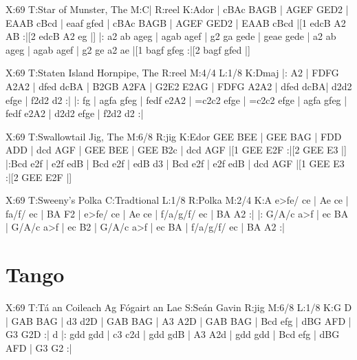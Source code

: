 \documentclass{article}
\begin{document}
\begin{abc}[name]
X:69
T:Star of Munster, The
M:C|
R:reel
K:Ador
| cBAc BAGB | AGEF GED2 | EAAB cBcd | eaaf gfed |
cBAc BAGB | AGEF GED2 | EAAB cBcd |[1 edcB A2 AB :|[2 edcB A2 eg |]
|: a2 ab ageg | agab agef | g2 ga gede | geae gede |
a2 ab ageg | agab agef | g2 ge a2 ae |[1 bagf gfeg :|[2 bagf gfed |]
\end{abc}

\begin{abc}[name]
X:69
T:Staten Island Hornpipe, The
R:reel
M:4/4
L:1/8
K:Dmaj
|: A2 | FDFG A2A2 | dfed dcBA | B2GB A2FA | G2E2 E2AG |
FDFG A2A2 | dfed dcBA| d2d2 efge | f2d2 d2 :|
|: fg | agfa gfeg | fedf e2A2 | =c2c2 efge | =c2c2 efge |
agfa gfeg | fedf e2A2 | d2d2 efge | f2d2 d2 :|
\end{abc}

\begin{abc}[name]
X:69
T:Swallowtail Jig, The
M:6/8
R:jig
K:Edor
GEE BEE | GEE BAG | FDD ADD | dcd AGF |
GEE BEE | GEE B2c | dcd AGF |[1 GEE E2F :|[2 GEE E3 |]
|:Bcd e2f | e2f edB | Bcd e2f | edB d3 |
Bcd e2f | e2f edB | dcd AGF |[1 GEE E3 :|[2 GEE E2F |]
\end{abc}

\begin{abc}[name]
X:69
T:Sweeny's Polka
C:Tradtional
L:1/8
R:Polka
M:2/4
K:A
e>fe/ ce | Ae ce | fa/f/ ec | BA F2 |
e>fe/ ce | Ae ce | f/a/g/f/ ec | BA A2 :|
|: G/A/c a>f | ec BA | G/A/c a>f | ec B2 |
G/A/c a>f | ec BA | f/a/g/f/ ec | BA A2 :|
\end{abc}

\section{Tango}

\begin{abc}[name]
X:69
T:Tá an Coileach Ag Fógairt an Lae
S:Seán Gavin
R:jig
M:6/8
L:1/8
K:G
D | GAB BAG | d3 d2D | GAB BAG | A3 A2D |
GAB BAG | Bcd efg | dBG AFD | G3 G2D :|
d |: gdd gdd | c3 c2d | gdd gdB | A3 A2d |
gdd gdd | Bcd efg | dBG AFD | G3 G2 :|
\end{abc}
\end{document}
